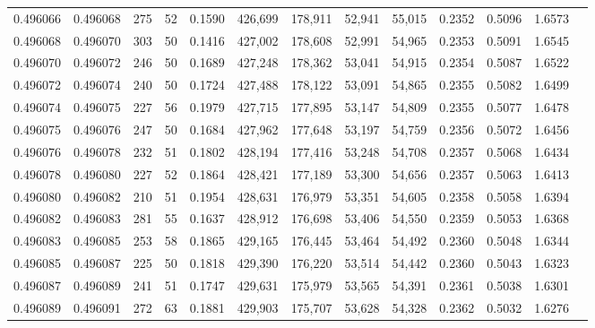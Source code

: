 \begin{tabular}{rrrrrrrrrrrrr}
0.496066 & 0.496068 &   275 &  52 &                                     0.1590 & 426,699 & 178,911 &  52,941 &  55,015 & 0.2352 & 0.5096 & 1.6573 \\
0.496068 & 0.496070 &   303 &  50 &                                     0.1416 & 427,002 & 178,608 &  52,991 &  54,965 & 0.2353 & 0.5091 & 1.6545 \\
0.496070 & 0.496072 &   246 &  50 &                                     0.1689 & 427,248 & 178,362 &  53,041 &  54,915 & 0.2354 & 0.5087 & 1.6522 \\
0.496072 & 0.496074 &   240 &  50 &                                     0.1724 & 427,488 & 178,122 &  53,091 &  54,865 & 0.2355 & 0.5082 & 1.6499 \\
0.496074 & 0.496075 &   227 &  56 &                                     0.1979 & 427,715 & 177,895 &  53,147 &  54,809 & 0.2355 & 0.5077 & 1.6478 \\
0.496075 & 0.496076 &   247 &  50 &                                     0.1684 & 427,962 & 177,648 &  53,197 &  54,759 & 0.2356 & 0.5072 & 1.6456 \\
0.496076 & 0.496078 &   232 &  51 &                                     0.1802 & 428,194 & 177,416 &  53,248 &  54,708 & 0.2357 & 0.5068 & 1.6434 \\
0.496078 & 0.496080 &   227 &  52 &                                     0.1864 & 428,421 & 177,189 &  53,300 &  54,656 & 0.2357 & 0.5063 & 1.6413 \\
0.496080 & 0.496082 &   210 &  51 &                                     0.1954 & 428,631 & 176,979 &  53,351 &  54,605 & 0.2358 & 0.5058 & 1.6394 \\
0.496082 & 0.496083 &   281 &  55 &                                     0.1637 & 428,912 & 176,698 &  53,406 &  54,550 & 0.2359 & 0.5053 & 1.6368 \\
0.496083 & 0.496085 &   253 &  58 &                                     0.1865 & 429,165 & 176,445 &  53,464 &  54,492 & 0.2360 & 0.5048 & 1.6344 \\
0.496085 & 0.496087 &   225 &  50 &                                     0.1818 & 429,390 & 176,220 &  53,514 &  54,442 & 0.2360 & 0.5043 & 1.6323 \\
0.496087 & 0.496089 &   241 &  51 &                                     0.1747 & 429,631 & 175,979 &  53,565 &  54,391 & 0.2361 & 0.5038 & 1.6301 \\
0.496089 & 0.496091 &   272 &  63 &                                     0.1881 & 429,903 & 175,707 &  53,628 &  54,328 & 0.2362 & 0.5032 & 1.6276 \\

\end{tabular}
